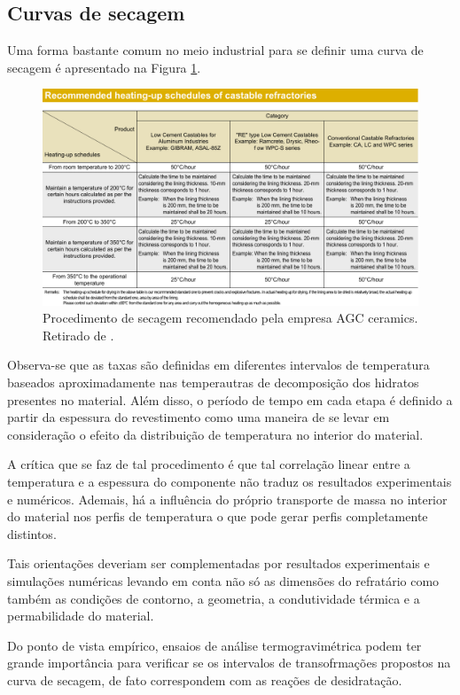 \subsection{Curvas de secagem}
Uma forma bastante comum no meio industrial para se definir uma curva de secagem
é apresentado na Figura \ref{fig:industrial_HUC}.

\begin{figure}[ht]
\centering
\includegraphics[width=\linewidth]{./figures/industrial_HUC.pdf}
\caption{Procedimento de secagem recomendado pela empresa AGC ceramics. Retirado
  de \cite{agc2016}. \label{fig:industrial_HUC}}
\end{figure}

Observa-se que as taxas são definidas em diferentes intervalos de temperatura
baseados aproximadamente nas temperautras de decomposição dos hidratos presentes
no material. Além disso, o período de tempo em cada etapa é definido a partir da
espessura do revestimento como uma maneira de se levar em consideração o efeito
da distribuição de temperatura no interior do material.

A crítica que se faz de tal procedimento é que tal correlação linear entre a
temperatura e a espessura do componente não traduz os resultados experimentais e
numéricos. Ademais, há a influência do próprio transporte de massa no
interior do material nos perfis de temperatura o que pode gerar perfis
completamente distintos.

Tais orientações deveriam ser complementadas por resultados experimentais e
simulações numéricas levando em conta não só as dimensões do refratário como
também as condições de contorno, a geometria, a condutividade térmica e a
permabilidade do material.

Do ponto de vista empírico, ensaios de análise termogravimétrica podem ter
grande importância para verificar se os intervalos de transofrmações propostos
na curva de secagem, de fato correspondem com as reações de desidratação.

